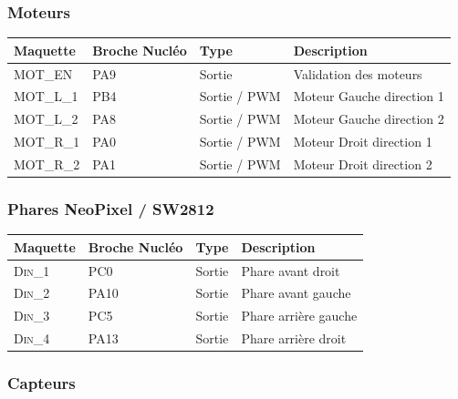 \documentclass[a4paper,11pt,titlepage]{article} %
\begin{document}
\subsubsection{Moteurs}

\begin{center}
\begin{tabular}{|l|l|l|l|}
\hline 
Maquette & \textbf{Broche Nucléo} & Type & Description \\ 
\hline 
\textsc{MOT\_EN} & PA9 & Sortie & Validation des moteurs\\ 
\hline 
\textsc{MOT\_L\_1} & PB4 & Sortie / PWM & Moteur Gauche direction 1\\ 
\textsc{MOT\_L\_2} & PA8 & Sortie / PWM & Moteur Gauche direction 2\\ 
\hline 
\textsc{MOT\_R\_1} & PA0 & Sortie / PWM & Moteur Droit direction 1\\ 
\textsc{MOT\_R\_2} & PA1 & Sortie / PWM & Moteur Droit direction 2\\ 
\hline  
\end{tabular} 
\end{center}

\subsubsection{Phares NeoPixel / SW2812}

\begin{center}
\begin{tabular}{|l|l|l|l|}
\hline 
Maquette & \textbf{Broche Nucléo} & Type & Description \\ 
\hline 
\textsc{Din\_1} & PC0 & Sortie & Phare avant droit\\ 
\textsc{Din\_2} & PA10 & Sortie & Phare avant gauche\\ 
\textsc{Din\_3} & PC5 & Sortie & Phare arrière gauche\\ 
\textsc{Din\_4} & PA13 & Sortie & Phare arrière droit\\ 
\hline  
\end{tabular} 
\end{center}

\subsubsection{Capteurs}
\end{document}
